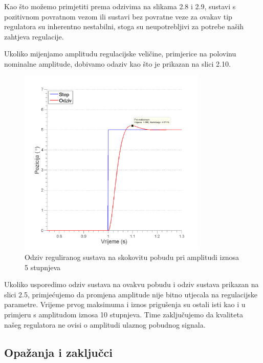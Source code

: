 \documentclass[12pt,a4paper]{article}
\begin{document}
\newpage

Kao što možemo primjetiti prema odzivima na slikama 2.8 i 2.9, sustavi s pozitivnom povratnom vezom ili sustavi bez povratne veze za ovakav tip regulatora su inherentno nestabilni, stoga su neupotrebljivi za potrebe naših zahtjeva regulacije.
\newline


Ukoliko mijenjamo amplitudu regulacijske veličine, primjerice na polovinu nominalne amplitude, dobivamo odaziv kao što je prikazan na slici 2.10.

\begin{figure}[h]
	\begin{center}
	\includegraphics[width=0.8\textwidth] {odziv_pola_nominalne.png}
    \caption{Odziv reguliranog sustava na skokovitu pobudu pri amplitudi iznosa 5 stupnjeva }
    \end{center}
\end{figure}

Ukoliko usporedimo odziv sustava na ovakvu pobudu i odziv sustava prikazan na slici 2.5, primjećujemo da promjena amplitude nije bitno utjecala na regulacijske parametre. Vrijeme prvog maksimuma i iznos prigušenja su ostali isti kao i u primjeru s amplitudom iznosa 10 stupnjeva. Time zaključujemo da kvaliteta našeg regulatora ne ovisi o amplitudi ulaznog pobudnog signala.

\newpage

\subsection{Opažanja i zaključci}
\end{document}

